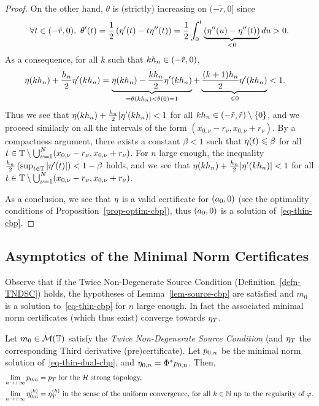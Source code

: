 \begin{proof}
On the other hand, $\theta$ is (strictly) increasing on $(-\tilde{r}, 0]$ since 
  \begin{align}
    \forall t\in (-\tilde{r},0),\    \theta'(t)=\frac{1}{2} \left(\eta'(t)-t\eta''(t) \right)=\frac{1}{2} \int_0^t\underbrace{(\eta''(u)-\eta''(t))}_{<0}du>0.
  \end{align}
  As a consequence, for all $k$ such that $k{h_n}\in (-\tilde{r},0)$, 
  \begin{align}
    \eta(k{h_n})+\frac{{h_n}}{2} \eta'(k{h_n}) &=\underbrace{\eta(k{h_n})-\frac{k{h_n}}{2} \eta'(k{h_n})}_{=\theta(k{h_n})<\theta(0)=1} + \underbrace{\frac{(k+1){h_n}}{2} \eta'(k{h_n})}_{\leqslant 0}<1.
  \end{align}
  Thus we see that $\eta(k{h_n})+\frac{{h_n}}{2} |\eta'(k{h_n})|<1$ for all $k{h_n} \in(-\tilde{r},\tilde{r})\setminus\{0\}$, and we proceed similarly on all the intervals of the form $(x_{0,\nu}-r_\nu,x_{0,\nu}+r_\nu)$. By a compactness argument, there exists a constant $\beta<1$ such that $\eta(t)\leqslant \beta$ for all $t\in \mathbb{T}\setminus \bigcup_{\nu=1}^N(x_{0,\nu}-r_{\nu},x_{0,\nu}+r_{\nu})$. For $n$ large enough, the inequality $\frac{{h_n}}{2} \left(\sup_{t\in \mathbb{T}} |\eta'(t)|\right)<1-\beta$ holds, and we see that $\eta(k{h_n}) + \frac{{h_n}}{2} |\eta'(k{h_n})|<1$ for all $t\in \mathbb{T}\setminus \bigcup_{\nu=1}^N(x_{0,\nu}-r_{\nu},x_{0,\nu}+r_\nu)$.

  As a conclusion, we see that $\eta$ is a valid certificate for $(a_0,0)$ (see the optimality conditions of Proposition~\ref{prop-optim-cbp}), thus  $(a_0,0)$ is a solution of~\eqref{eq-thin-cbp}.  
\end{proof}

\subsection{Asymptotics of the Minimal Norm Certificates}

Observe that if the Twice Non-Degenerate Source Condition (Definition~\ref{defn-TNDSC}) holds, the hypotheses of Lemma~\ref{lem-source-cbp} are satisfied and $m_0$ is a solution to~\eqref{eq-thin-cbp} for $n$ large enough. In fact the associated minimal norm certificates (which thus exist) converge towards $\eta_T$.

\begin{prop}\label{prop-cv-cbpcertif}
  Let $m_0\in \mathcal{M}(\mathbb{T})$ satisfy the \textit{Twice Non-Degenerate Source Condition} (and $\eta_T$ the corresponding Third derivative (pre)certificate). Let $p_{0,n}$ be the minimal norm solution of~\eqref{eq-thin-dual-cbp}, and $\eta_{0,n}=\Phi^*p_{0,n}$. Then,
\begin{align}
    \lim_{n\to +\infty} p_{0,n} &=p_T \mbox{ for the $\mathcal{H}$ strong topology,}\\ 
    \lim_{n\to +\infty} \eta_{0,n}^{(k)} &=\eta_T^{(k)} \mbox{ in the sense of the uniform convergence, for all $k\in \mathbb{N}$ up to the regularity of $\varphi$.} 
\end{align}
\end{prop}

